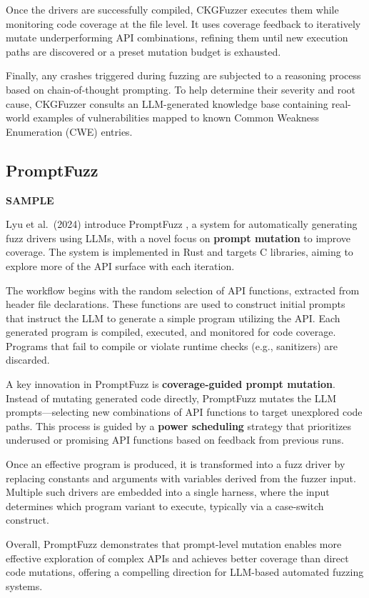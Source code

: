 \documentclass[
  a4paper,
  DIV=11,
  numbers=noendperiod]{scrreprt}
\theoremstyle{definition}
\theoremstyle{remark}
\begin{document}
Once the drivers are successfully compiled, CKGFuzzer executes them
while monitoring code coverage at the file level. It uses coverage
feedback to iteratively mutate underperforming API combinations,
refining them until new execution paths are discovered or a preset
mutation budget is exhausted.

Finally, any crashes triggered during fuzzing are subjected to a
reasoning process based on chain-of-thought prompting. To help determine
their severity and root cause, CKGFuzzer consults an LLM-generated
knowledge base containing real-world examples of vulnerabilities mapped
to known Common Weakness Enumeration (CWE) entries.

\subsection{PromptFuzz}\label{promptfuzz}

\textbf{SAMPLE}

Lyu et al.~(2024) introduce PromptFuzz \autocite{lyu2024}, a system for
automatically generating fuzz drivers using LLMs, with a novel focus on
\textbf{prompt mutation} to improve coverage. The system is implemented
in Rust and targets C libraries, aiming to explore more of the API
surface with each iteration.

The workflow begins with the random selection of API functions,
extracted from header file declarations. These functions are used to
construct initial prompts that instruct the LLM to generate a simple
program utilizing the API. Each generated program is compiled, executed,
and monitored for code coverage. Programs that fail to compile or
violate runtime checks (e.g., sanitizers) are discarded.

A key innovation in PromptFuzz is \textbf{coverage-guided prompt
mutation}. Instead of mutating generated code directly, PromptFuzz
mutates the LLM prompts---selecting new combinations of API functions to
target unexplored code paths. This process is guided by a \textbf{power
scheduling} strategy that prioritizes underused or promising API
functions based on feedback from previous runs.

Once an effective program is produced, it is transformed into a fuzz
driver by replacing constants and arguments with variables derived from
the fuzzer input. Multiple such drivers are embedded into a single
harness, where the input determines which program variant to execute,
typically via a case-switch construct.

Overall, PromptFuzz demonstrates that prompt-level mutation enables more
effective exploration of complex APIs and achieves better coverage than
direct code mutations, offering a compelling direction for LLM-based
automated fuzzing systems.
\end{document}
